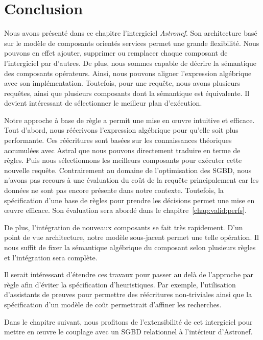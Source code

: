 \section{Conclusion}\label{sec:contrib:astronef:conclusion}
Nous avons présenté dans ce chapitre l'intergiciel \textit{Astronef}. Son architecture basé sur le modèle de composants orientés services permet une grande flexibilité. Nous pouvons en effet ajouter, supprimer ou remplacer chaque composant de l'intergiciel par d'autres. De plus, nous sommes capable de décrire la sémantique des composants opérateurs. Ainsi, nous pouvons aligner l'expression algébrique avec son implémentation. Toutefois, pour une requête, nous avons plusieurs requêtes, ainsi que plusieurs composants dont la sémantique est équivalente. Il devient intéressant de sélectionner le meilleur plan d'exécution.

Notre approche à base de règle a permit une mise en œuvre intuitive et efficace. Tout d'abord, nous réécrivons l'expression algébrique pour qu'elle soit plus performante. Ces réécritures sont basées sur les connaissances théoriques accumulées avec Astral que nous pouvons directement traduire en terme de règles. Puis nous sélectionnons les meilleurs composants pour exécuter cette nouvelle requête. Contrairement au domaine de l'optimisation des SGBD, nous n'avons pas recours à une évaluation du coût de la requête principalement car les données ne sont pas encore présente dans notre contexte. Toutefois, la spécification d'une base de règles pour prendre les décisions permet une mise en œuvre efficace. Son évaluation sera abordé dans le chapitre~\ref{chap:valid:perfs}. 

De plus, l'intégration de nouveaux composants se fait très rapidement. D'un point de vue architecture, notre modèle sous-jacent permet une telle opération. Il nous suffit de fixer la sémantique algébrique du composant selon plusieurs règles et l'intégration sera complète.

Il serait intéressant d'étendre ces travaux pour passer au delà de l'approche par règle afin d'éviter la spécification d'heuristiques. Par exemple, l'utilisation d'assistants de preuves pour permettre des réécritures non-triviales ainsi que la spécification d'un modèle de coût permettrait d'affiner les recherches.

Dans le chapitre suivant, nous profitons de l'extensibilité de cet intergiciel pour mettre en œuvre le couplage avec un SGBD relationnel à l'intérieur d'Astronef.